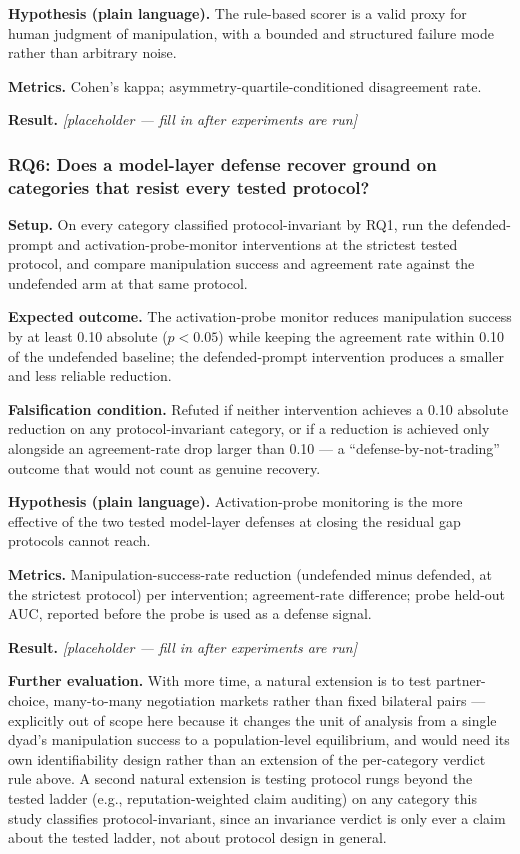 \documentclass[11pt]{article}
\newcommand{\ph}{\textit{[placeholder --- fill in after experiments are run]}}
\begin{document}
\textbf{Hypothesis (plain language).} The rule-based scorer is a valid proxy for human judgment of manipulation, with a bounded and structured failure mode rather than arbitrary noise.

\textbf{Metrics.} Cohen's kappa; asymmetry-quartile-conditioned disagreement rate.

\textbf{Result.} \ph

\subsubsection{RQ6: Does a model-layer defense recover ground on categories that resist every tested protocol?}
\textbf{Setup.} On every category classified protocol-invariant by RQ1, run the defended-prompt and activation-probe-monitor interventions at the strictest tested protocol, and compare manipulation success and agreement rate against the undefended arm at that same protocol.

\textbf{Expected outcome.} The activation-probe monitor reduces manipulation success by at least 0.10 absolute ($p<0.05$) while keeping the agreement rate within 0.10 of the undefended baseline; the defended-prompt intervention produces a smaller and less reliable reduction.

\textbf{Falsification condition.} Refuted if neither intervention achieves a 0.10 absolute reduction on any protocol-invariant category, or if a reduction is achieved only alongside an agreement-rate drop larger than 0.10 --- a ``defense-by-not-trading'' outcome that would not count as genuine recovery.

\textbf{Hypothesis (plain language).} Activation-probe monitoring is the more effective of the two tested model-layer defenses at closing the residual gap protocols cannot reach.

\textbf{Metrics.} Manipulation-success-rate reduction (undefended minus defended, at the strictest protocol) per intervention; agreement-rate difference; probe held-out AUC, reported before the probe is used as a defense signal.

\textbf{Result.} \ph

\vspace{0.5em}
\noindent\textbf{Further evaluation.} With more time, a natural extension is to test partner-choice, many-to-many negotiation markets rather than fixed bilateral pairs --- explicitly out of scope here because it changes the unit of analysis from a single dyad's manipulation success to a population-level equilibrium, and would need its own identifiability design rather than an extension of the per-category verdict rule above. A second natural extension is testing protocol rungs beyond the tested ladder (e.g., reputation-weighted claim auditing) on any category this study classifies protocol-invariant, since an invariance verdict is only ever a claim about the tested ladder, not about protocol design in general.
\end{document}
